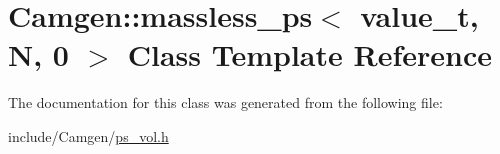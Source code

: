 \hypertarget{a00356}{}\section{Camgen\+:\+:massless\+\_\+ps$<$ value\+\_\+t, N, 0 $>$ Class Template Reference}
\label{a00356}


The documentation for this class was generated from the following file\+:\begin{DoxyCompactItemize}
\item 
include/\+Camgen/\hyperlink{a00746}{ps\+\_\+vol.\+h}\end{DoxyCompactItemize}
